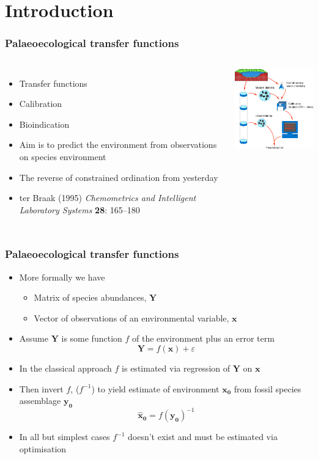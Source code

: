 \documentclass{beamer}
\begin{document}
\section{Introduction}
\begin{frame}
    \frametitle{Palaeoecological transfer functions}
    \begin{columns}
    
    \column{7cm}
    \begin{itemize}
        \item Transfer functions
        \item Calibration
        \item Bioindication
        \item Aim is to predict the environment from observations on species environment
        \item The reverse of constrained ordination from yesterday
        \item ter Braak (1995) \emph{Chemometrics and Intelligent Laboratory Systems} \textbf{28}: 165--180
    \end{itemize}
    
    \column{5cm}
    \includegraphics[width=5cm]{transferfunction}
    \end{columns}
\end{frame}

\begin{frame}
    \frametitle{Palaeoecological transfer functions}
    \begin{itemize}
        \item More formally we have
        \begin{itemize}
            \item Matrix of species abundances, $\mathbf{Y}$
            \item Vector of observations of an environmental variable, $\mathbf{x}$
        \end{itemize}
        \item Assume $\mathbf{Y}$ is some function $f$ of the environment plus an error term
        $$\mathbf{Y} = f(\mathbf{x}) + \varepsilon$$
        \item In the \alert{classical} approach $f$ is estimated via regression of $\mathbf{Y}$ on $\mathbf{x}$
        \item Then invert $f$, ($f^{-1}$) to yield estimate of environment $\mathbf{x_0}$ from fossil species assemblage $\mathbf{y_0}$
        $$\mathbf{\hat{x}_0} = f(\mathbf{y_0})^{-1}$$
        \item In all but simplest cases $f^{-1}$ doesn't exist and must be estimated via optimisation
    \end{itemize}

\end{frame}
\end{document}
